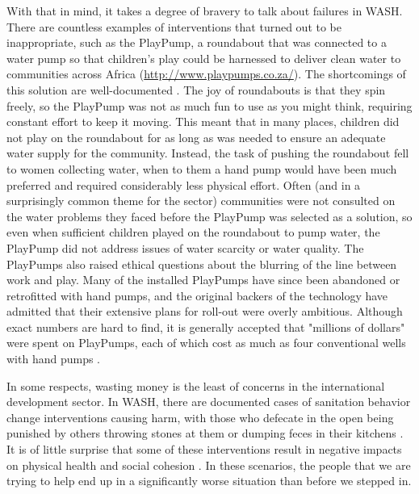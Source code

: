 \documentclass[twocolumn, serif, authordate, editorial]{jote-article}
\begin{document}
With that in mind, it takes a degree of bravery to talk about failures in WASH. There are countless examples of interventions that turned out to be inappropriate, such as the PlayPump, a roundabout that was connected to a water pump so that children’s play could be harnessed to deliver clean water to communities across Africa (\href{http://www.playpumps.co.za/}{http://www.playpumps.co.za/}). The shortcomings of this solution are well-documented \parencite{Borland2011}. The joy of roundabouts is that they spin freely, so the PlayPump was not as much fun to use as you might think, requiring constant effort to keep it moving. This meant that in many places, children did not play on the roundabout for as long as was needed to ensure an adequate water supply for the community. Instead, the task of pushing the roundabout fell to women collecting water, when to them a hand pump would have been much preferred and required considerably less physical effort. Often (and in a surprisingly common theme for the sector) communities were not consulted on the water problems they faced before the PlayPump was selected as a solution, so even when sufficient children played on the roundabout to pump water, the PlayPump did not address issues of water scarcity or water quality. The PlayPumps also raised ethical questions about the blurring of the line between work and play. Many of the installed PlayPumps have since been abandoned or retrofitted with hand pumps, and the original backers of the technology have admitted that their extensive plans for roll-out were overly ambitious. Although exact numbers are hard to find, it is generally accepted that "millions of dollars" were spent on PlayPumps, each of which cost as much as four conventional wells with hand pumps \parencite{Chambers2009}.

In some respects, wasting money is the least of concerns in the international development sector. In WASH, there are documented cases of sanitation behavior change interventions causing harm, with those who defecate in the open being punished by others throwing stones at them \parencite{Devine2009} or dumping feces in their kitchens \parencite{Chatterjee2011}. It is of little surprise that some of these interventions result in negative impacts on physical health and social cohesion \parencite{Barrington2017}. In these scenarios, the people that we are trying to help end up in a significantly worse situation than before we stepped in.
\end{document}
